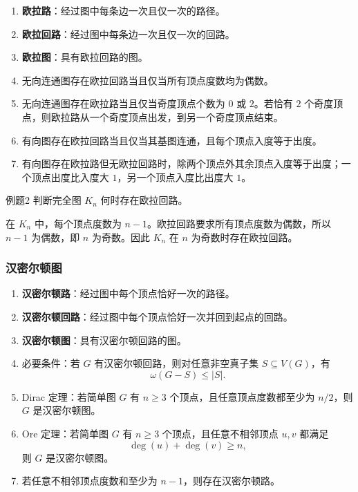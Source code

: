 \begin{enumerate}
	\item \textbf{欧拉路}：经过图中每条边一次且仅一次的路径。
	\item \textbf{欧拉回路}：经过图中每条边一次且仅一次的回路。
	\item \textbf{欧拉图}：具有欧拉回路的图。
	\item 无向连通图存在欧拉回路当且仅当所有顶点度数均为偶数。
	\item 无向连通图存在欧拉路当且仅当奇度顶点个数为 \(0\) 或 \(2\)。若恰有 \(2\) 个奇度顶点，则欧拉路从一个奇度顶点出发，到另一个奇度顶点结束。
	\item 有向图存在欧拉回路当且仅当其基图连通，且每个顶点入度等于出度。
	\item 有向图存在欧拉路但无欧拉回路时，除两个顶点外其余顶点入度等于出度；一个顶点出度比入度大 \(1\)，另一个顶点入度比出度大 \(1\)。
\end{enumerate}

\begin{question}{例题2}
	判断完全图 \(K_n\) 何时存在欧拉回路。
	
	\begin{solution}
	在 \(K_n\) 中，每个顶点度数为 \(n-1\)。欧拉回路要求所有顶点度数为偶数，所以 \(n-1\) 为偶数，即 \(n\) 为奇数。因此 \(K_n\) 在 \(n\) 为奇数时存在欧拉回路。
	\end{solution}
\end{question}

\subsubsection{汉密尔顿图}

\begin{enumerate}
	\item \textbf{汉密尔顿路}：经过图中每个顶点恰好一次的路径。
	\item \textbf{汉密尔顿回路}：经过图中每个顶点恰好一次并回到起点的回路。
	\item \textbf{汉密尔顿图}：具有汉密尔顿回路的图。
	\item 必要条件：若 \(G\) 有汉密尔顿回路，则对任意非空真子集 \(S\subseteq V(G)\)，有
	\[
	\omega(G-S)\le |S|.
	\]
	\item Dirac 定理：若简单图 \(G\) 有 \(n\ge3\) 个顶点，且任意顶点度数都至少为 \(n/2\)，则 \(G\) 是汉密尔顿图。
	\item Ore 定理：若简单图 \(G\) 有 \(n\ge3\) 个顶点，且任意不相邻顶点 \(u,v\) 都满足
	\[
	\deg(u)+\deg(v)\ge n,
	\]
	则 \(G\) 是汉密尔顿图。
	\item 若任意不相邻顶点度数和至少为 \(n-1\)，则存在汉密尔顿路。
\end{enumerate}

